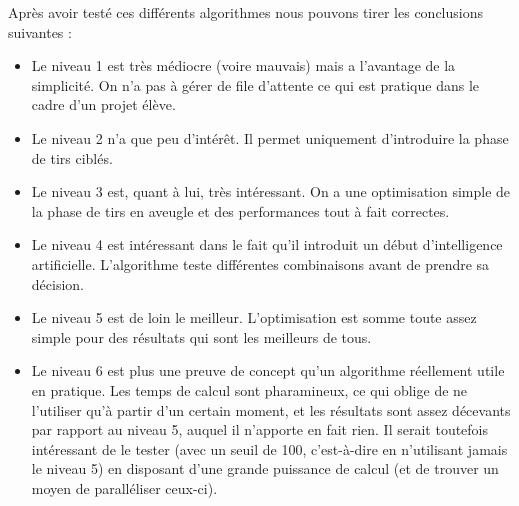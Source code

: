 Après avoir testé ces différents algorithmes nous pouvons tirer les conclusions suivantes :
\begin{itemize}
\item Le niveau 1 est très médiocre (voire mauvais) mais a l'avantage de la simplicité. On n'a pas à gérer de file d'attente ce qui est pratique dans le cadre d'un projet élève.
\item Le niveau 2 n'a que peu d'intérêt. Il permet uniquement d'introduire la phase de tirs ciblés.
\item Le niveau 3 est, quant à lui, très intéressant. On a une optimisation simple de la phase de tirs en aveugle et des performances tout à fait correctes.
\item Le niveau 4 est intéressant dans le fait qu'il introduit un début d'intelligence artificielle. L'algorithme teste différentes combinaisons avant de prendre sa décision. 
\item Le niveau 5 est de loin le meilleur. L'optimisation est somme toute assez simple pour des résultats qui sont les meilleurs de tous.
\item Le niveau 6 est plus une preuve de concept qu'un algorithme réellement utile en pratique. Les temps de calcul sont pharamineux, ce qui oblige de ne l'utiliser qu'à partir d'un certain moment, et les résultats sont assez décevants par rapport au niveau 5, auquel il n'apporte en fait rien. Il serait toutefois intéressant de le tester (avec un seuil de 100, c'est-à-dire en n'utilisant jamais le niveau 5) en disposant d'une grande puissance de calcul (et de trouver un moyen de paralléliser ceux-ci).
\end{itemize}

%
